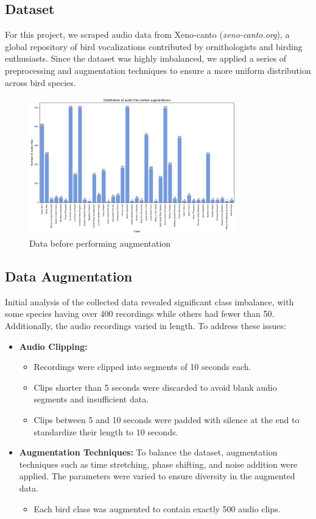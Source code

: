 \subsection{Dataset}
For this project, we scraped audio data from Xeno-canto (\textit{xeno-canto.org}), a global repository of bird vocalizations contributed 
by ornithologists and birding enthusiasts. Since the dataset was highly imbalanced, we applied a series of preprocessing and augmentation 
techniques to ensure a more uniform distribution across bird species.

\begin{figure}[h!]
    \centering
    \includegraphics[width=0.8\textwidth]{images/before_augmentation.png}
    \caption{Data before performing augmentation}
    \label{fig:visualization}
\end{figure}
\newpage


\subsection{Data Augmentation}
Initial analysis of the collected data revealed significant class imbalance, with some species having over 400 recordings while others had fewer than 50. Additionally, the audio recordings varied in length. To address these issues:  
\begin{itemize}
    \item \textbf{Audio Clipping:}  
    \begin{itemize}
        \item Recordings were clipped into segments of 10 seconds each.  
        \item Clips shorter than 5 seconds were discarded to avoid blank audio segments and insufficient data.  
        \item Clips between 5 and 10 seconds were padded with silence at the end to standardize their length to 10 seconds.  
    \end{itemize}

    \item \textbf{Augmentation Techniques:}  
    To balance the dataset, augmentation techniques such as time stretching, phase shifting, and noise addition were applied. The parameters were varied to ensure diversity in the augmented data.  
    \begin{itemize}
        \item Each bird class was augmented to contain exactly 500 audio clips.
    \end{itemize}
\end{itemize}

